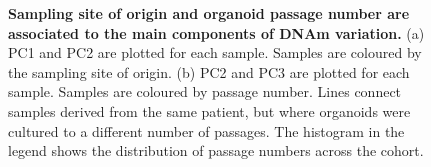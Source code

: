 \documentclass[a4paper]{article}
\begin{document}
\begin{figure}
\begin{flushleft}
\hfil
{}

\caption{\textbf{Sampling site of origin and organoid passage number are associated to the main components of DNAm variation.} (a) PC1 and PC2 are plotted for each sample. Samples are coloured by the sampling site of origin. (b) PC2 and PC3 are plotted for each sample. Samples are coloured by passage number. Lines connect samples derived from the same patient, but where organoids were cultured to a different number of passages. The histogram in the legend shows the distribution of passage numbers across the cohort.}
\label{fig:main}
\end{flushleft}
\end{figure}
\end{document}
